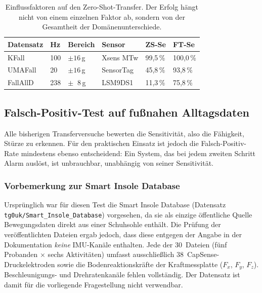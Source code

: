 \documentclass[11pt,a4paper,oneside]{report}
\begin{document}
\begin{table}[H]
\centering
\caption{Einflussfaktoren auf den Zero-Shot-Transfer. Der Erfolg
         hängt nicht von einem einzelnen Faktor ab, sondern von
         der Gesamtheit der Domänenunterschiede.}
\label{tab:domainfactors}
\small
\begin{tabularx}{\textwidth}{l C{1.3cm} C{1.3cm} l C{1.3cm} C{1.3cm}}
\toprule
\textbf{Datensatz} & \textbf{Hz} & \textbf{Bereich} & \textbf{Sensor} & \textbf{ZS-Se} & \textbf{FT-Se} \\
\midrule
KFall    & 100 & $\pm 16$\,g & Xsens MTw    & 99,5\,\% & 100,0\,\% \\
UMAFall  &  20 & $\pm 16$\,g & SensorTag    & 45,8\,\% & 93,8\,\% \\
FallAllD & 238 & $\pm\;\;8$\,g & LSM9DS1   & 11,3\,\% & 75,8\,\% \\
\bottomrule
\end{tabularx}
\end{table}

\subsection{Falsch-Positiv-Test auf fußnahen Alltagsdaten}
\label{sec:fptest}

Alle bisherigen Transferversuche bewerten die Sensitivität, also die
Fähigkeit, Stürze zu erkennen. Für den praktischen Einsatz ist jedoch
die Falsch-Positiv-Rate mindestens ebenso entscheidend: Ein System,
das bei jedem zweiten Schritt Alarm auslöst, ist unbrauchbar,
unabhängig von seiner Sensitivität.

\subsubsection{Vorbemerkung zur Smart Insole Database}

Ursprünglich war für diesen Test die Smart Insole
Database (Datensatz \texttt{tg0uk/Smart\_Insole\_Database})
vorgesehen, da sie als einzige öffentliche Quelle Bewegungsdaten
direkt aus einer Schuhsohle enthält. Die Prüfung der veröffentlichten Dateien ergab jedoch, dass
diese entgegen der Angabe in der Dokumentation \emph{keine}
IMU-Kanäle enthalten. Jede der 30~Dateien (fünf Probanden $\times$
sechs Aktivitäten) umfasst ausschließlich 38~CapSense-Druckelektroden
sowie die Bodenreaktionskräfte der Kraftmessplatte
($F_x$, $F_y$, $F_z$). Beschleunigungs- und Drehratenkanäle fehlen
vollständig. Der Datensatz ist damit für die vorliegende
Fragestellung nicht verwendbar.
\end{document}

